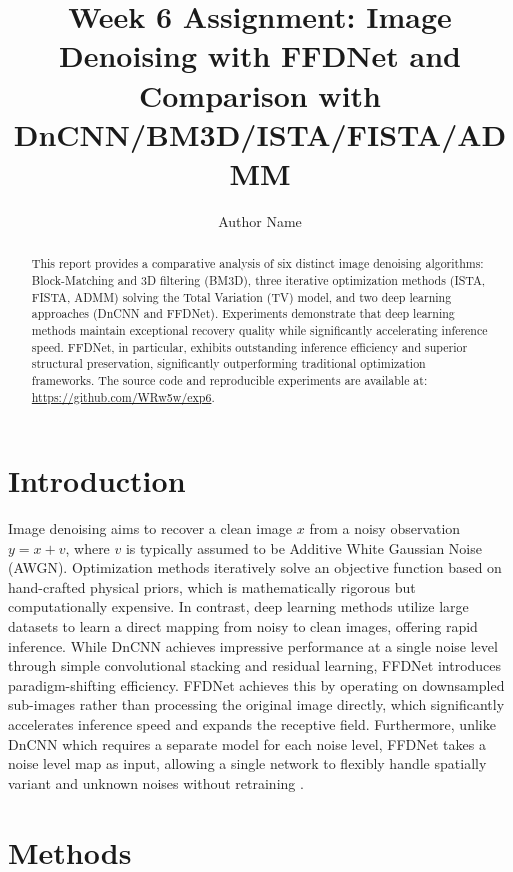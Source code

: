 \documentclass[journal]{IEEEtran}
\begin{document}
\title{Week 6 Assignment: Image Denoising with FFDNet and Comparison with DnCNN/BM3D/ISTA/FISTA/ADMM}

\author{Author Name}

\maketitle

\begin{abstract}
This report provides a comparative analysis of six distinct image denoising algorithms: Block-Matching and 3D filtering (BM3D), three iterative optimization methods (ISTA, FISTA, ADMM) solving the Total Variation (TV) model, and two deep learning approaches (DnCNN and FFDNet). Experiments demonstrate that deep learning methods maintain exceptional recovery quality while significantly accelerating inference speed. FFDNet, in particular, exhibits outstanding inference efficiency and superior structural preservation, significantly outperforming traditional optimization frameworks. The source code and reproducible experiments are available at: \url{https://github.com/WRw5w/exp6}.
\end{abstract}

\section{Introduction}
Image denoising aims to recover a clean image $x$ from a noisy observation $y = x + v$, where $v$ is typically assumed to be Additive White Gaussian Noise (AWGN). Optimization methods iteratively solve an objective function based on hand-crafted physical priors, which is mathematically rigorous but computationally expensive. In contrast, deep learning methods utilize large datasets to learn a direct mapping from noisy to clean images, offering rapid inference. While DnCNN achieves impressive performance at a single noise level through simple convolutional stacking and residual learning, FFDNet introduces paradigm-shifting efficiency. FFDNet achieves this by operating on downsampled sub-images rather than processing the original image directly, which significantly accelerates inference speed and expands the receptive field. Furthermore, unlike DnCNN which requires a separate model for each noise level, FFDNet takes a noise level map as input, allowing a single network to flexibly handle spatially variant and unknown noises without retraining \cite{zhang2018ffdnet}.

\section{Methods}
\end{document}
